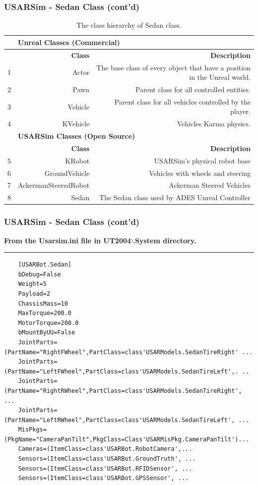 \documentclass{beamer}
\newenvironment{mylisting}
{\begin{list}{}{\setlength{\leftmargin}{1em}}\item\scriptsize\bfseries}
{\end{list}}
\begin{document}
\begin{frame}
	\frametitle{USARSim - Sedan Class (cont'd)}
	\begin{table}
	\caption{The class hierarchy of Sedan class.}
	{\tiny
	\begin{center}
	\begin{tabular}{|r|r|r|}
	\hline
	           & \multicolumn{ 2}{|l|}{{\bf Unreal Classes (Commercial)}} \\
	\hline
	           & {\bf Class} & {\bf Description} \\
	\hline
	         1 &      Actor & The base class of every object that have a position in the Unreal world. \\
	\hline
	         2 &       Pawn & Parent class for all controlled entities. \\
	\hline
	         3 &    Vehicle & Parent class for all vehicles controlled by the player. \\
	\hline
	         4 &   KVehicle & Vehicles Karma physics. \\
	\hline
	           & \multicolumn{ 2}{|l|}{{\bf USARSim Classes (Open Source)}} \\
	\hline
	           & {\bf Class} & {\bf Description} \\
	\hline
	         5 &     KRobot & USARSim's physical robot base \\
	\hline
	         6 & GroundVehicle & Vehicles with wheels and steering \\
	\hline
	         7 & AckermanSteeredRobot & Ackerman Steered Vehicles \\
	\hline
	         8 &      Sedan & The Sedan class used by ADES Unreal Controller \\
	\hline
	\end{tabular}
	\end{center}
	}
	\label{tab:sedanclass}
	\end{table}
\end{frame}

\begin{frame}[fragile]
	\frametitle{USARSim - Sedan Class (cont'd)}
	\begin{mylisting}
	From the Usarsim.ini file in UT2004$\backslash$System directory. 
	\vspace*{2pt}\hrule
	{\tiny	
	\begin{verbatim}
	[USARBot.Sedan]
	bDebug=False
	Weight=5
	Payload=2
	ChassisMass=10
	MaxTorque=200.0
	MotorTorque=200.0
	bMountByUU=False
	JointParts=(PartName="RightFWheel",PartClass=class'USARModels.SedanTireRight' ...
	JointParts=(PartName="LeftFWheel",PartClass=class'USARModels.SedanTireLeft',. ..
	JointParts=(PartName="RightRWheel",PartClass=class'USARModels.SedanTireRight', ...
	JointParts=(PartName="LeftRWheel",PartClass=class'USARModels.SedanTireLeft', ...
	MisPkgs=(PkgName="CameraPanTilt",PkgClass=Class'USARMisPkg.CameraPanTilt')...
	Cameras=(ItemClass=class'USARBot.RobotCamera',...
	Sensors=(ItemClass=class'USARBot.GroundTruth', ...
	Sensors=(ItemClass=class'USARBot.RFIDSensor', ...
	Sensors=(ItemClass=class'USARBot.GPSSensor', ...
	\end{verbatim}
	}
	\end{mylisting}
\end{frame}
\end{document}
